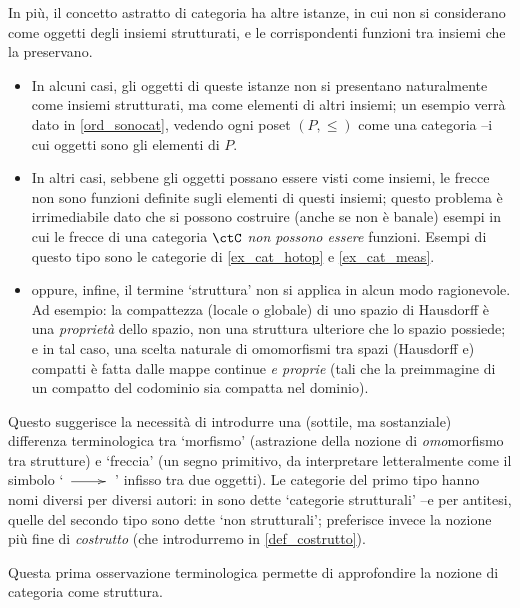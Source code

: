 \begin{remark}
	In più, il concetto astratto di categoria ha altre istanze, in cui non si considerano come oggetti degli insiemi strutturati, e le corrispondenti funzioni tra insiemi che la preservano.
	\begin{itemize}
		\item In alcuni casi, gli oggetti di queste istanze non si presentano naturalmente come insiemi strutturati, ma come elementi di altri insiemi; un esempio verrà dato in \ref{ord_sonocat}, vedendo ogni poset \((P,\le)\) come una categoria --i cui oggetti sono gli elementi di \(P\).
		\item In altri casi, sebbene gli oggetti possano essere visti come insiemi, le frecce non sono funzioni definite sugli elementi di questi insiemi; questo problema è irrimediabile dato che si possono costruire (anche se non è banale) esempi in cui le frecce di una categoria \(\ctC\) \emph{non possono essere} funzioni. Esempi di questo tipo sono le categorie di \ref{ex_cat_hotop} e \ref{ex_cat_meas}.
		\item oppure, infine, il termine `struttura' non si applica in alcun modo ragionevole. Ad esempio: la compattezza (locale o globale) di uno spazio di Hausdorff è una \emph{proprietà} dello spazio, non una struttura ulteriore che lo spazio possiede; e in tal caso, una scelta naturale di omomorfismi tra spazi (Hausdorff e) compatti è fatta dalle mappe continue \emph{e proprie} (tali che la preimmagine di un compatto del codominio sia compatta nel dominio).
	\end{itemize}
	Questo suggerisce la necessità di introdurre una (sottile, ma sostanziale) differenza terminologica tra `morfismo' (astrazione della nozione di \emph{omo}morfismo tra strutture) e `freccia' (un segno primitivo, da interpretare letteralmente come il simbolo `\(\xymatrix{ \ar[r] & }\)' infisso tra due oggetti). Le categorie del primo tipo hanno nomi diversi per diversi autori: in \cite[5.3.1.5]{kromer} sono dette `categorie strutturali' --e per antitesi, quelle del secondo tipo sono dette `non strutturali'; \cite{acc} preferisce invece la nozione più fine di \emph{costrutto} (che introdurremo in \ref{def_costrutto}).
\end{remark}
Questa prima osservazione	terminologica permette di approfondire la nozione di categoria come struttura.
